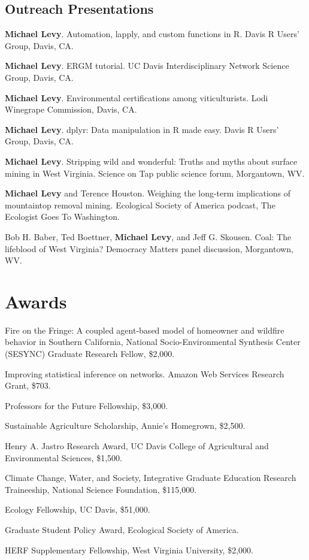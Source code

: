 \subsection{Outreach Presentations}\label{outreach-presentations}

\begin{description}
\tightlist
\item[2016]
\textbf{Michael Levy}. Automation, lapply, and custom functions in R.
Davis R Users' Group, Davis, CA.
\item[2015]
\textbf{Michael Levy}. ERGM tutorial. UC Davis Interdisciplinary Network
Science Group, Davis, CA.
\item[2014]
\textbf{Michael Levy}. Environmental certifications among
viticulturists. Lodi Winegrape Commission, Davis, CA.
\item[2014]
\textbf{Michael Levy}. dplyr: Data manipulation in R made easy. Davis R
Users' Group, Davis, CA.
\item[2012]
\textbf{Michael Levy}. Stripping wild and wonderful: Truths and myths
about surface mining in West Virginia. Science on Tap public science
forum, Morgantown, WV.
\item[2011]
\textbf{Michael Levy} and Terence Houston. Weighing the long-term
implications of mountaintop removal mining. Ecological Society of
America podcast, The Ecologist Goes To Washington.
\item[2011]
Bob H. Baber, Ted Boettner, \textbf{Michael Levy}, and Jeff G. Skousen.
Coal: The lifeblood of West Virginia? Democracy Matters panel
discussion, Morgantown, WV.
\end{description}

\section{Awards}\label{awards}

\begin{description}
\tightlist
\item[2016]
Fire on the Fringe: A coupled agent-based model of homeowner and
wildfire behavior in Southern California, National Socio-Environmental
Synthesis Center (SESYNC) Graduate Research Fellow, \$2,000.
\item[2016]
Improving statistical inference on networks. Amazon Web Services
Research Grant, \$703.
\item[2015]
Professors for the Future Fellowship, \$3,000.
\item[2014]
Sustainable Agriculture Scholarship, Annie's Homegrown, \$2,500.
\item[2014]
Henry A. Jastro Research Award, UC Davis College of Agricultural and
Environmental Sciences, \$1,500.
\item[2012]
Climate Change, Water, and Society, Integrative Graduate Education
Research Traineeship, National Science Foundation, \$115,000.
\item[2012]
Ecology Fellowship, UC Davis, \$51,000.
\item[2011]
Graduate Student Policy Award, Ecological Society of America.
\item[2009]
HERF Supplementary Fellowship, West Virginia University, \$2,000.
\end{description}

